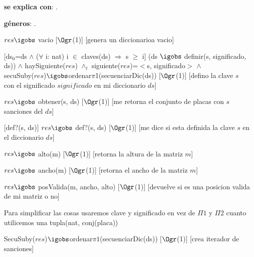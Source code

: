 \begin{Interfaz}

	\textbf{se explica con}: .

	\textbf{géneros}: .


	{$res \igobs$ vacio}
	[$\Ogr$(1)]
	[genera un diccionarioa vacio]

	[ds$_0$=ds $\land$ ($\forall$ i: nat) i $\in$ claves(ds) $\Rightarrow$ s $\geq$ i]
	{(ds $\igobs$ definir(s, significado, ds)) $\land$ haySiguiente($res$) $\land_l$ siguiente($res$)=$<$s, significado$>$ $\land$\\
	secuSuby($res$)$\igobs$ordenar$\pi$1(secuenciarDic(ds))}%
	[$\Ogr$(1)]
	[defino la clave $s$ con el significado $significado$ en mi diccionario $ds$]
	
	{$res \igobs$ obtener(s, ds)}
	[$\Ogr$(1)]
	[me retorna el conjunto de placas con $s$ sanciones del $ds$]

	[def?(s, ds)]
	{$res \igobs$ def?(s, ds)}  
	[$\Ogr$(1)]
	[me dice si esta definida la clave $s$ en el diccionario $ds$]

	{$res \igobs$ alto(m)}  
	[$\Ogr$(1)]
	[retorna la altura de la matriz $m$]

	{$res \igobs$ ancho(m)}  
	[$\Ogr$(1)]
	[retorna el ancho de la matriz $m$]

	{$res \igobs$ posValida(m, ancho, alto)}  
	[$\Ogr$(1)]
	[devuelve si es una posicion valida de mi matriz o no]
	
	
	
	
	Para simplificar las cosas usaremos clave y significado en vez de $\Pi1$ y $\Pi2$ cuanto utilicemos una tupla(nat, conj(placa))
	
	{SecuSuby($res$)$\igobs$ordenar$\pi1$(secuenciarDic(ds))}
	[$\Ogr$(1)]
	[crea iterador de sanciones]
	

\end{Interfaz}
